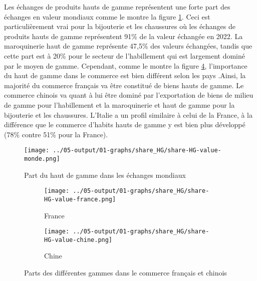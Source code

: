 \documentclass[french,10pt,a4paper]{article}
\begin{document}
Les échanges de produits hauts de gamme représentent une forte part des échanges en valeur mondiaux comme le montre la figure \ref{fig:share-HG-value-monde}. Ceci est particulièrement vrai pour la bijouterie et les chaussures où les échanges de produits hauts de gamme représentent 91\% de la valeur échangée en 2022. La maroquinerie haut de gamme représente 47,5\% des valeurs échangées, tandis que cette part est à 20\% pour le secteur de l'habillement qui est largement dominé par le moyen de gamme. Cependant, comme le montre la figure \ref{fig:share-HG-value-france-chine}, l'importance du haut de gamme dans le commerce est bien différent selon les pays .Ainsi, la majorité du commerce français va être constitué de biens hauts de gamme. Le commerce chinois va quant à lui être dominé par l'exportation de biens de milieu de gamme pour l'habillement et la maroquinerie et haut de gamme pour la bijouterie et les chaussures. L'Italie a un profil similaire à celui de la France, à la différence que le commerce d'habits hauts de gamme y est bien plus développé (78\% contre 51\% pour la France). 

\begin{figure}[!h]
  \centering
  \texttt{[image: ../05-output/01-graphs/share\_HG/share-HG-value-monde.png]}
  \caption{Part du haut de gamme dans les échanges mondiaux}
  \label{fig:share-HG-value-monde}
\end{figure}


\begin{figure}[!h]
  \centering
  \begin{subfigure}{\textwidth}
    \centering    
    \texttt{[image: ../05-output/01-graphs/share\_HG/share-HG-value-france.png]}
    \caption{France}
    \label{fig:share-HG-value-france}
  \end{subfigure}
  \vspace{0.5cm}
  \begin{subfigure}{\textwidth}
    \centering
 \texttt{[image: ../05-output/01-graphs/share\_HG/share-HG-value-chine.png]}
 \caption{Chine}
 \label{fig:share-HG-value-chine}
  \end{subfigure}
  \caption{Parts des différentes gammes dans le commerce français et chinois}
  \label{fig:share-HG-value-france-chine}
\end{figure}
\end{document}
